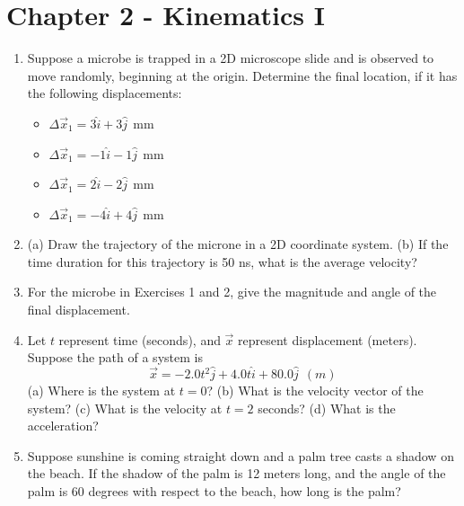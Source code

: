 \documentclass{article}
\begin{document}
\section{Chapter 2 - Kinematics I}

\begin{enumerate}
\item Suppose a microbe is trapped in a 2D microscope slide and is observed to move randomly, beginning at the origin.  Determine the final location, if it has the following displacements:
\begin{itemize}
\item $\Delta\vec{x}_1 = 3\hat{i}+3\hat{j} ~~$mm
\item $\Delta\vec{x}_1 = -1\hat{i}-1\hat{j} ~~$mm
\item $\Delta\vec{x}_1 = 2\hat{i}-2\hat{j} ~~$mm
\item $\Delta\vec{x}_1 = -4\hat{i}+4\hat{j} ~~$mm
\end{itemize}
\item (a) Draw the trajectory of the microne in a 2D coordinate system.  (b) If the time duration for this trajectory is 50 ns, what is the average velocity? \\ \vspace{3cm}
\item For the microbe in Exercises 1 and 2, give the magnitude and angle of the final displacement. \\ \vspace{2cm}
\item Let $t$ represent time (seconds), and $\vec{x}$ represent displacement (meters).  Suppose the path of a system is
\begin{equation}
\vec{x} = -2.0 t^2 \hat{j} + 4.0 t \hat{i} + 80.0 \hat{j}~~(m)
\end{equation}
(a) Where is the system at $t=0$? (b) What is the velocity vector of the system? (c) What is the velocity at $t=2$ seconds? (d) What is the acceleration? \\ \vspace{2.5cm}
\item Suppose sunshine is coming straight down and a palm tree casts a shadow on the beach.  If the shadow of the palm is 12 meters long, and the angle of the palm is 60 degrees with respect to the beach, how long is the palm?
\end{enumerate}
\end{document}
